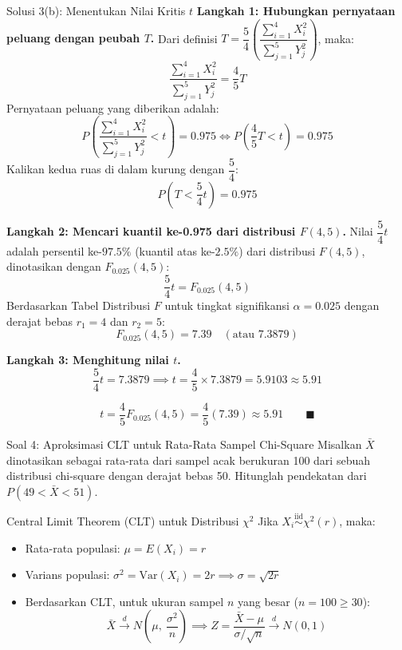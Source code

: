 \documentclass[10pt,twoside]{article}
\begin{document}
\begin{solbox}{Solusi 3(b): Menentukan Nilai Kritis $t$}
\textbf{Langkah 1: Hubungkan pernyataan peluang dengan peubah $T$.}
Dari definisi $T = \dfrac{5}{4} \left(\dfrac{\sum_{i=1}^4 X_i^2}{\sum_{j=1}^5 Y_j^2}\right)$, maka:
\[
\frac{\sum_{i=1}^4 X_i^2}{\sum_{j=1}^5 Y_j^2} = \frac{4}{5} T
\]
Pernyataan peluang yang diberikan adalah:
\[
P\left( \frac{\sum_{i=1}^4 X_i^2}{\sum_{j=1}^5 Y_j^2} < t \right) = 0.975 \iff P\left(\frac{4}{5} T < t\right) = 0.975
\]
Kalikan kedua ruas di dalam kurung dengan $\dfrac{5}{4}$:
\[
P\left( T < \frac{5}{4} t \right) = 0.975
\]

\textbf{Langkah 2: Mencari kuantil ke-0.975 dari distribusi $F(4, 5)$.}
Nilai $\dfrac{5}{4} t$ adalah persentil ke-$97.5\%$ (kuantil atas ke-$2.5\%$) dari distribusi $F(4, 5)$, dinotasikan dengan $F_{0.025}(4, 5)$:
\[
\frac{5}{4} t = F_{0.025}(4, 5)
\]
Berdasarkan Tabel Distribusi $F$ untuk tingkat signifikansi $\alpha = 0.025$ dengan derajat bebas $r_1 = 4$ dan $r_2 = 5$:
\[
F_{0.025}(4, 5) = 7.39 \quad (\text{atau } 7.3879)
\]

\textbf{Langkah 3: Menghitung nilai $t$.}
\[
\frac{5}{4} t = 7.3879 \implies t = \frac{4}{5} \times 7.3879 = 5.9103 \approx 5.91
\]

\[
\boxed{t = \frac{4}{5} F_{0.025}(4, 5) = \frac{4}{5}(7.39) \approx 5.91} \qquad \blacksquare
\]
\end{solbox}

\begin{soalbox}{Soal 4: Aproksimasi CLT untuk Rata-Rata Sampel Chi-Square}
Misalkan $\bar{X}$ dinotasikan sebagai rata-rata dari sampel acak berukuran 100 dari sebuah distribusi chi-square dengan derajat bebas 50. Hitunglah pendekatan dari $P(49 < \bar{X} < 51)$.
\end{soalbox}

\begin{tipbox}{Central Limit Theorem (CLT) untuk Distribusi $\chi^2$}
Jika $X_i \overset{\mathrm{iid}}{\sim} \chi^2(r)$, maka:
\begin{itemize}
  \item Rata-rata populasi: $\mu = E(X_i) = r$
  \item Varians populasi: $\sigma^2 = \mathrm{Var}(X_i) = 2r \implies \sigma = \sqrt{2r}$
  \item Berdasarkan CLT, untuk ukuran sampel $n$ yang besar ($n = 100 \ge 30$):
  \[
  \bar{X} \xrightarrow{d} N\left(\mu, \ \frac{\sigma^2}{n}\right) \implies Z = \frac{\bar{X} - \mu}{\sigma / \sqrt{n}} \xrightarrow{d} N(0, 1)
  \]
\end{itemize}
\end{tipbox}
\end{document}
